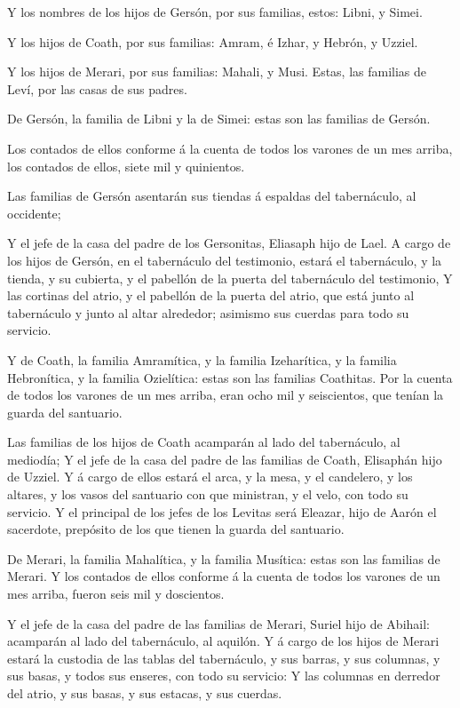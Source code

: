  Y los nombres de los hijos de Gersón, por sus familias,
estos: Libni, y Simei.

 Y los hijos de Coath, por sus familias: Amram, é Izhar,
y Hebrón, y Uzziel.

 Y los hijos de Merari, por sus familias: Mahali, y Musi.
Estas, las familias de Leví, por las casas de sus padres.

 De Gersón, la familia de Libni y la de Simei: estas son
las familias de Gersón.

 Los contados de ellos conforme á la cuenta de todos los
varones de un mes arriba, los contados de ellos, siete mil y quinientos.

 Las familias de Gersón asentarán sus tiendas á espaldas
del tabernáculo, al occidente;

 Y el jefe de la casa del padre de los Gersonitas,
Eliasaph hijo de Lael.  A cargo de los hijos de Gersón,
en el tabernáculo del testimonio, estará el tabernáculo, y la tienda, y
su cubierta, y el pabellón de la puerta del tabernáculo del testimonio,
 Y las cortinas del atrio, y el pabellón de la puerta del
atrio, que está junto al tabernáculo y junto al altar alrededor;
asimismo sus cuerdas para todo su servicio.

 Y de Coath, la familia Amramítica, y la familia
Izeharítica, y la familia Hebronítica, y la familia Ozielítica: estas
son las familias Coathitas.  Por la cuenta de todos los
varones de un mes arriba, eran ocho mil y seiscientos, que tenían la
guarda del santuario.

 Las familias de los hijos de Coath acamparán al lado del
tabernáculo, al mediodía;  Y el jefe de la casa del padre
de las familias de Coath, Elisaphán hijo de Uzziel.  Y á
cargo de ellos estará el arca, y la mesa, y el candelero, y los altares,
y los vasos del santuario con que ministran, y el velo, con todo su
servicio.  Y el principal de los jefes de los Levitas
será Eleazar, hijo de Aarón el sacerdote, prepósito de los que tienen la
guarda del santuario.

 De Merari, la familia Mahalítica, y la familia Musítica:
estas son las familias de Merari.  Y los contados de
ellos conforme á la cuenta de todos los varones de un mes arriba, fueron
seis mil y doscientos.

 Y el jefe de la casa del padre de las familias de
Merari, Suriel hijo de Abihail: acamparán al lado del tabernáculo, al
aquilón.  Y á cargo de los hijos de Merari estará la
custodia de las tablas del tabernáculo, y sus barras, y sus columnas, y
sus basas, y todos sus enseres, con todo su servicio:  Y
las columnas en derredor del atrio, y sus basas, y sus estacas, y sus
cuerdas.

